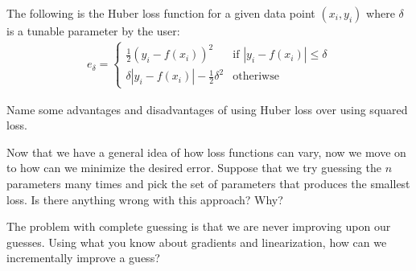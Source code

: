 \begin{enumerate}

\qitem
The following is the Huber loss function for a given data point $(x_i, y_i)$ where $\delta$ is a tunable parameter by the user:
\begin{align*}
  e_{\delta} =
  \begin{cases}
    \frac{1}{2}(y_{i}-f(x_{i}))^{2} & \text{if } |y_i-f(x_i)| \leq \delta \\
    \delta|y_{i}-f(x_{i})|-\frac{1}{2}\delta^{2} & \text{otheriwse}
  \end{cases}
\end{align*}

Name some advantages and disadvantages of using Huber loss over using squared loss.


\qitem
Now that we have a general idea of how loss functions can vary, now we move on to how can we minimize the desired error.
Suppose that we try guessing the $n$ parameters many times and pick the set of parameters that produces the smallest loss.
Is there anything wrong with this approach?
Why?


\qitem The problem with complete guessing is that we are never improving upon our guesses.
Using what you know about gradients and linearization, how can we incrementally improve a guess?



\end{enumerate}
